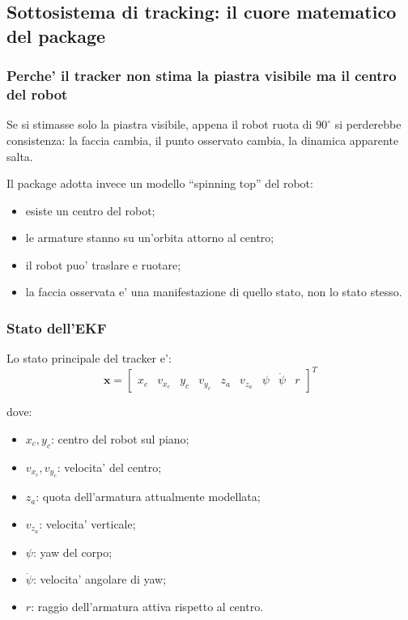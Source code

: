 \documentclass[11pt,a4paper]{article}
\begin{document}
\subsection{Sottosistema di tracking: il cuore matematico del package}

\subsubsection{Perche' il tracker non stima la piastra visibile ma il centro del robot}

Se si stimasse solo la piastra visibile, appena il robot ruota di \(90^\circ\) si perderebbe consistenza: la faccia cambia, il punto osservato cambia, la dinamica apparente salta.

Il package adotta invece un modello ``spinning top'' del robot:
\begin{itemize}[leftmargin=1.4em]
  \item esiste un centro del robot;
  \item le armature stanno su un'orbita attorno al centro;
  \item il robot puo' traslare e ruotare;
  \item la faccia osservata e' una manifestazione di quello stato, non lo stato stesso.
\end{itemize}

\subsubsection{Stato dell'EKF}

Lo stato principale del tracker e':
\begin{equation}
  \mathbf{x} =
  \begin{bmatrix}
    x_c & v_{x_c} & y_c & v_{y_c} & z_a & v_{z_a} & \psi & \dot{\psi} & r
  \end{bmatrix}^{T}
\end{equation}

dove:
\begin{itemize}[leftmargin=1.4em]
  \item \(x_c, y_c\): centro del robot sul piano;
  \item \(v_{x_c}, v_{y_c}\): velocita' del centro;
  \item \(z_a\): quota dell'armatura attualmente modellata;
  \item \(v_{z_a}\): velocita' verticale;
  \item \(\psi\): yaw del corpo;
  \item \(\dot{\psi}\): velocita' angolare di yaw;
  \item \(r\): raggio dell'armatura attiva rispetto al centro.
\end{itemize}
\end{document}
